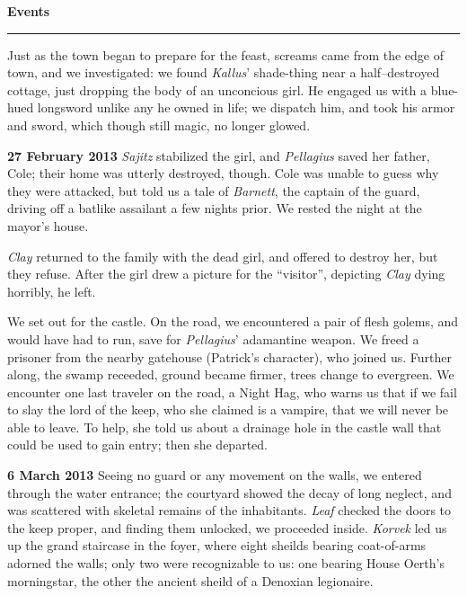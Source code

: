 \documentclass[letterpaper]{article}
\newcommand{\e}[1]{\emph{#1}}
\newcommand{\B}[1]{\textbf{#1}}
\newenvironment{notesection}[1]
{ {\huge \B{#1}}\hrule\vspace{0.5em}\begingroup\fontsize{9pt}{12pt}\selectfont}
{\endgroup}
\begin{document}
\begin{notesection}{Events}
Just as the town began to prepare for the feast, screams came from the edge of town, and we investigated: we found \e{Kallus}' shade-thing near a half--destroyed cottage, just dropping the body of an unconcious girl.  He engaged us with a blue-hued longsword unlike any he owned in life; we dispatch him, and took his armor and sword, which though still magic, no longer glowed.

\B{27 February 2013} \e{Sajitz} stabilized the girl, and \e{Pellagius} saved her father, Cole; their home was utterly destroyed, though.  Cole was unable to guess why they were attacked, but told us a tale of \e{Barnett}, the captain of the guard, driving off a batlike assailant a few nights prior. We rested the night at the mayor's house.

\e{Clay} returned to the family with the dead girl, and offered to destroy her, but they refuse.  After the girl drew a picture for the ``visitor'', depicting \e{Clay} dying horribly, he left.

We set out for the castle. On the road, we encountered a pair of flesh golems, and would have had to run, save for \e{Pellagius}' adamantine weapon.  We freed a prisoner from the nearby gatehouse (Patrick's character), who joined us.  Further along, the swamp receeded, ground became firmer, trees change to evergreen.  We encounter one last traveler on the road, a Night Hag, who warns us that if we fail to slay the lord of the keep, who she claimed is a vampire, that we will never be able to leave. To help, she told us about a drainage hole in the castle wall that could be used to gain entry; then she departed.

\B{6 March 2013} Seeing no guard or any movement on the walls, we entered through the water entrance; the courtyard showed the decay of long neglect, and was scattered with skeletal remains of the inhabitants. \e{Leaf} checked the doors to the keep proper, and finding them unlocked, we proceeded inside.  \e{Korvek} led us up the grand staircase in the foyer, where eight sheilds bearing coat-of-arms adorned the walls; only two were recognizable to us: one bearing House Oerth's morningstar, the other the ancient sheild of a Denoxian legionaire.


\end{notesection}
\end{document}
